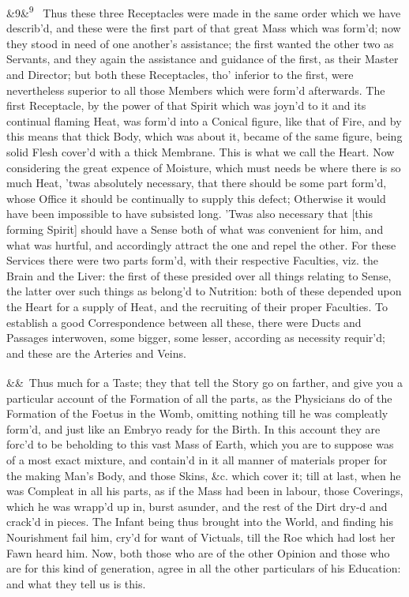 \documentclass[12pt]{article}
\newcommand{\para}[1][]{\par\noindent\ifx&#1&\else\textsuperscript{\footnotesize #1}~\fi}
\begin{document}
\para[9] Thus these three Receptacles were made in the same order which we have describ'd, and these were the first part of that great Mass which was form'd; now they stood in need of one another's assistance; the first wanted the other two as Servants, and they again the assistance and guidance of the first, as their Master and Director; but both these Receptacles, tho' inferior to the first, were nevertheless superior to all those Members which were form'd afterwards. The first Receptacle, by the power of that Spirit which was joyn'd to it and its continual flaming Heat, was form'd into a Conical figure, like that of Fire, and by this means that thick Body, which was about it, became of the same figure, being solid Flesh cover'd with a thick Membrane. This is what we call the Heart. Now considering the great expence of Moisture, which must needs be where there is so much Heat, 'twas absolutely necessary, that there should be some part form'd, whose Office it should be continually to supply this defect; Otherwise it would have been impossible to have subsisted long. 'Twas also necessary that [this forming Spirit] should have a Sense both of what was convenient for him, and what was hurtful, and accordingly attract the one and repel the other. For these Services there were two parts form'd, with their respective Faculties, viz. the Brain and the Liver: the first of these presided over all things relating to Sense, the latter over such things as belong'd to Nutrition: both of these depended upon the Heart for a supply of Heat, and the recruiting of their proper Faculties. To establish a good Correspondence between all these, there were Ducts and Passages interwoven, some bigger, some lesser, according as necessity requir'd; and these are the Arteries and Veins.

\para Thus much for a Taste; they that tell the Story go on farther, and give you a particular account of the Formation of all the parts, as the Physicians do of the Formation of the Foetus in the Womb, omitting nothing till he was compleatly form'd, and just like an Embryo ready for the Birth. In this account they are forc'd to be beholding to this vast Mass of Earth, which you are to suppose was of a most exact mixture, and contain'd in it all manner of materials proper for the making Man's Body, and those Skins, \&c. which cover it; till at last, when he was Compleat in all his parts, as if the Mass had been in labour, those Coverings, which he was wrapp'd up in, burst asunder, and the rest of the Dirt dry-d and crack'd in pieces. The Infant being thus brought into the World, and finding his Nourishment fail him, cry'd for want of Victuals, till the Roe which had lost her Fawn heard him. Now, both those who are of the other Opinion and those who are for this kind of generation, agree in all the other particulars of his Education: and what they tell us is this.
\end{document}
